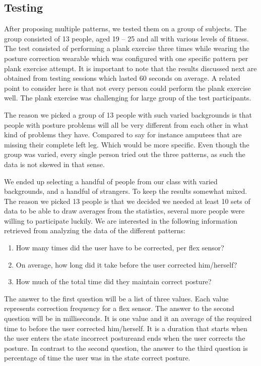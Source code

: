 \documentclass[sigconf]{acmart}
\begin{document}
\subsection{Testing}

After proposing multiple patterns, we tested them on a group of subjects. The group consisted of 13 people, aged 19 – 25 and all with various levels of fitness. The test consisted of performing a plank exercise three times while wearing the posture correction wearable which was configured with one specific pattern per plank exercise attempt. It is important to note that the results discussed next are obtained from testing sessions which lasted 60 seconds on average.
A related point to consider here is that not every person could perform the plank exercise well. The plank exercise was challenging for large group of the test participants. 


The reason we picked a group of 13 people with such varied backgrounds is that people with posture problems will all be very different from each other in what kind of problems they have. Compared to say for instance amputees that are missing their complete left leg. Which would be more specific. Even though the group was varied, every single person tried out the three patterns, as such the data is not skewed in that sense.

We ended up selecting a handful of people from our class with varied backgrounds, and a handful of strangers. To keep the results somewhat mixed. The reason we picked 13 people is that we decided we needed at least 10 sets of data to be able to draw averages from the statistics, several more people were willing to participate luckily.
We are interested in the following information retrieved from analyzing the data of the different patterns:
\begin{enumerate}
\item How many times did the user have to be corrected, per flex sensor?
\item On average, how long did it take before the user corrected him/herself?
\item How much of the total time did they maintain correct posture? 
\end{enumerate}

The answer to the first question will be a list of three values. Each value represents correction frequency for a flex sensor. 
The answer to the second question will be in milliseconds. It is one value and it an average of the required time to before the user corrected him/herself. It is a duration that starts when the user enters the state \textquotesingle incorrect posture\textquotesingle and ends when the user corrects the posture. 
In contrast to the second question, the answer to the third question is percentage of time the user was in the state \textquotesingle correct posture\textquotesingle. 
\end{document}
